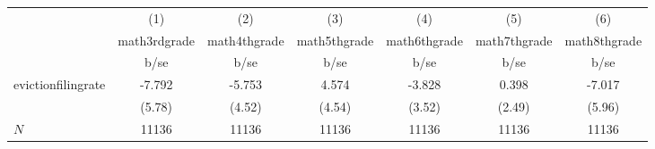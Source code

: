 {
\def\sym#1{\ifmmode^{#1}\else\(^{#1}\)\fi}
\begin{tabular}{l*{6}{c}}
\hline\hline
            &\multicolumn{1}{c}{(1)}  &\multicolumn{1}{c}{(2)}  &\multicolumn{1}{c}{(3)}  &\multicolumn{1}{c}{(4)}  &\multicolumn{1}{c}{(5)}  &\multicolumn{1}{c}{(6)}  \\
            &\multicolumn{1}{c}{math3rdgrade}&\multicolumn{1}{c}{math4thgrade}&\multicolumn{1}{c}{math5thgrade}&\multicolumn{1}{c}{math6thgrade}&\multicolumn{1}{c}{math7thgrade}&\multicolumn{1}{c}{math8thgrade}\\
            &                     b/se&                     b/se&                     b/se&                     b/se&                     b/se&                     b/se\\
\hline
evictionfilingrate&                   -7.792&                   -5.753&                    4.574&                   -3.828&                    0.398&                   -7.017\\
            &                   (5.78)&                   (4.52)&                   (4.54)&                   (3.52)&                   (2.49)&                   (5.96)\\
\hline
\(N\)       &                    11136&                    11136&                    11136&                    11136&                    11136&                    11136\\
\hline\hline
\end{tabular}
}
